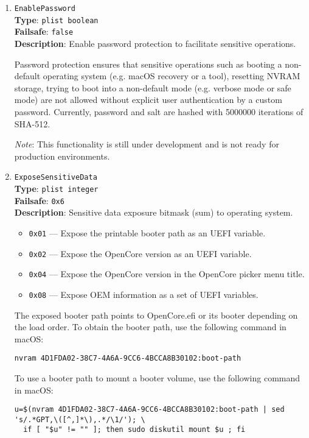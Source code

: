 \documentclass[]{article}
\providecommand{\tightlist}{%
  \setlength{\itemsep}{0pt}\setlength{\parskip}{0pt}}
\begin{document}
\begin{enumerate}
\item
  \texttt{EnablePassword}\\
  \textbf{Type}: \texttt{plist\ boolean}\\
  \textbf{Failsafe}: \texttt{false}\\
  \textbf{Description}: Enable password protection to facilitate sensitive operations.

  Password protection ensures that sensitive operations such as booting a non-default
  operating system (e.g. macOS recovery or a tool), resetting NVRAM storage,
  trying to boot into a non-default mode (e.g. verbose mode or safe mode) are not
  allowed without explicit user authentication by a custom password. Currently,
  password and salt are hashed with 5000000 iterations of SHA-512.

  \emph{Note}: This functionality is still under development and is not ready for
  production environments.

\item
  \texttt{ExposeSensitiveData}\\
  \textbf{Type}: \texttt{plist\ integer}\\
  \textbf{Failsafe}: \texttt{0x6}\\
  \textbf{Description}: Sensitive data exposure bitmask (sum) to operating system.

  \begin{itemize}
  \tightlist
    \item \texttt{0x01} --- Expose the printable booter path as an UEFI variable.
    \item \texttt{0x02} --- Expose the OpenCore version as an UEFI variable.
    \item \texttt{0x04} --- Expose the OpenCore version in the OpenCore picker menu title.
    \item \texttt{0x08} --- Expose OEM information as a set of UEFI variables.
  \end{itemize}

  The exposed booter path points to OpenCore.efi or its booter depending on the load order.
  To obtain the booter path, use the following command in macOS:
\begin{lstlisting}[label=nvrampath, style=ocbash]
nvram 4D1FDA02-38C7-4A6A-9CC6-4BCCA8B30102:boot-path
\end{lstlisting}

  To use a booter path to mount a booter volume, use the following command in macOS:
\begin{lstlisting}[label=nvrampathmount, style=ocbash]
u=$(nvram 4D1FDA02-38C7-4A6A-9CC6-4BCCA8B30102:boot-path | sed 's/.*GPT,\([^,]*\),.*/\1/'); \
  if [ "$u" != "" ]; then sudo diskutil mount $u ; fi
\end{lstlisting}


\end{enumerate}
\end{document}

